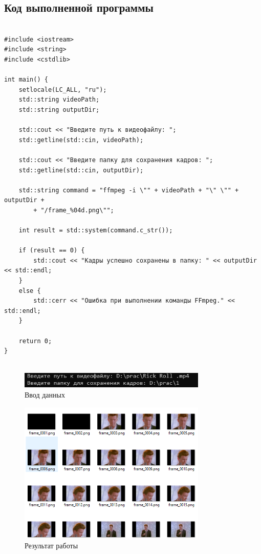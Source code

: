 \documentclass[12pt,a4paper]{scrartcl}
\begin{document}
\subsection{Код выполненной программы}
\sloppy
\begin{verbatim}

#include <iostream>
#include <string>
#include <cstdlib>

int main() {
    setlocale(LC_ALL, "ru");
    std::string videoPath;
    std::string outputDir;

    std::cout << "Введите путь к видеофайлу: ";
    std::getline(std::cin, videoPath);

    std::cout << "Введите папку для сохранения кадров: ";
    std::getline(std::cin, outputDir);

    std::string command = "ffmpeg -i \"" + videoPath + "\" \"" + outputDir +
        + "/frame_%04d.png\"";

    int result = std::system(command.c_str());

    if (result == 0) {
        std::cout << "Кадры успешно сохранены в папку: " << outputDir << std::endl;
    }
    else {
        std::cerr << "Ошибка при выполнении команды FFmpeg." << std::endl;
    }

    return 0;
}


\end{verbatim}

\begin{figure}[h]
 \centering
 \includegraphics[width=0.8\textwidth]{dan.png}
 \caption{Ввод данных}\label{fig:par}
\end{figure}

\begin{figure}[h]
 \centering
 \includegraphics[width=0.8\textwidth]{result.png}
 \caption{Результат работы}\label{fig:par}
\end{figure}
\end{document}
